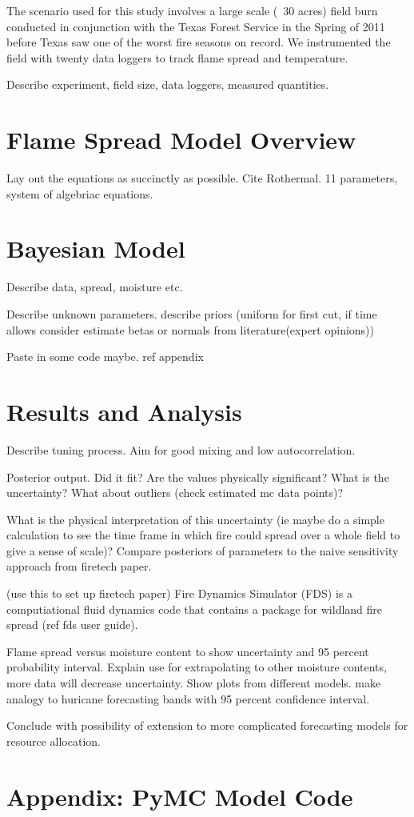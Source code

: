 \documentclass[11pt]{article}
\begin{document}
The scenario used for this study involves a large scale (~30 acres) field burn conducted in conjunction with the Texas Forest Service in the Spring of 2011 before Texas saw one of the worst fire seasons on record. We instrumented the field with twenty data loggers to track flame spread and temperature.   

Describe experiment, field size, data loggers, measured quantities.


\section{Flame Spread Model Overview}

Lay out the equations as succinctly as possible. Cite Rothermal. 11 parameters, system of algebriac equations.


\section{Bayesian Model}

Describe data, spread, moisture etc.

Describe unknown parameters. describe priors (uniform for first cut, if time allows consider estimate betas or normals from literature(expert opinions))

Paste in some code maybe. ref appendix


\section{Results and Analysis}

Describe tuning process. Aim for good mixing and low autocorrelation.

Posterior output. Did it fit? Are the values physically significant? What is the uncertainty? What about outliers (check estimated mc data points)? 

What is the physical interpretation of this uncertainty (ie maybe do a simple calculation to see the time frame in which fire could spread over a whole field to give a sense of scale)? Compare posteriors of parameters to the naive sensitivity approach from firetech paper. 

(use this to set up firetech paper) Fire Dynamics Simulator (FDS) is a computiational fluid dynamics code that contains a package for wildland fire spread (ref fds user guide).

Flame spread versus moisture content to show uncertainty and 95 percent probability interval. Explain use for extrapolating to other moisture contents, more data will decrease uncertainty. Show plots from different models. make analogy to huricane forecasting bands with 95 percent confidence interval.

Conclude with possibility of extension to more complicated forecasting models for resource allocation.

\clearpage
\appendix
\section{Appendix: PyMC Model Code}

% 
% 
\end{document}
